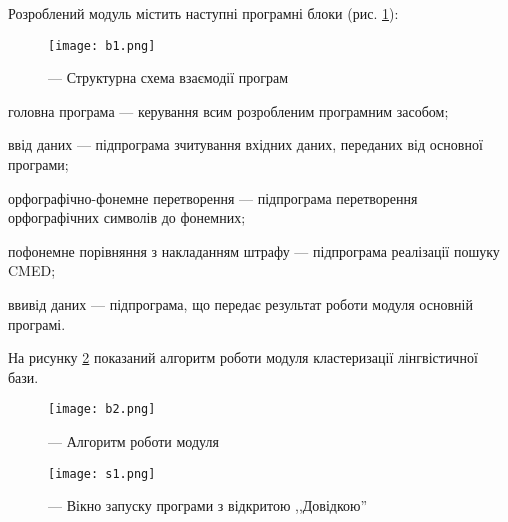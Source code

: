 \documentclass{diploma}
\begin{document}
Розроблений модуль містить наступні програмні блоки (рис. \ref{b1}):

\begin{figure}[hb] 
 	\centering 
 	\texttt{[image: b1.png]} 
 	\caption{--- Структурна схема взаємодії програм}\label{b1}
\end{figure}

\begin{itemizer}
\item головна програма --- керування всим розробленим програмним засобом;
\item ввід даних --- підпрограма зчитування вхідних даних, переданих від основної програми;
\item орфографічно-фонемне перетворення --- підпрограма перетворення орфографічних символів до фонемних;
\item пофонемне порівняння з накладанням штрафу --- підпрограма реалізації пошуку CMED;
\item ввивід даних --- підпрограма, що передає результат роботи модуля основній програмі.
\end{itemizer}

На рисунку \ref{b2} показаний алгоритм роботи модуля кластеризації лінгвістичної бази.

\begin{figure}[!hb] 
 	\centering 
 	\texttt{[image: b2.png]} 
 	\caption{--- Алгоритм роботи модуля} \label{b2}
\end{figure}


\begin{figure}[hb] 
 	\centering 
 	\texttt{[image: s1.png]} 
 	\caption{--- Вікно запуску програми з відкритою ,,Довідкою''}\label{s1}
\end{figure}
 
\end{document}

